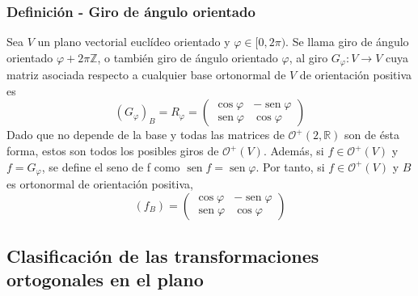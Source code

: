 \documentclass[12pt, a4paper, ones, notitlepage, openany,titlepage]{article}
\begin{document}
\subsubsection{Definición - Giro de ángulo orientado}
Sea $V$ un plano vectorial euclídeo orientado y $\varphi \in[0,2 \pi)$. Se llama giro de ángulo orientado $\varphi+2 \pi \mathbb{Z}$, o también giro de ángulo orientado $\varphi$, al giro $G_{\varphi}: V \rightarrow V$ cuya matriz asociada respecto a cualquier base ortonormal de $V$ de orientación positiva es
$$
\left(G_{\varphi}\right)_{B}=R_{\varphi}=\left(\begin{array}{rr}
	\cos \varphi & -\operatorname{sen} \varphi \\
	\operatorname{sen} \varphi & \cos \varphi
\end{array}\right)
$$
Dado que no depende de la base y todas las matrices de $\mathcal{O}^+(2,\mathbb{R})$ son de ésta forma, estos son todos los posibles giros de $\mathcal{O}^+(V)$. Además, si $f \in \mathcal{O}^+(V)$ y $f = G_\varphi$, se define el seno de f como $\operatorname{sen}f = \operatorname{sen}\varphi$. Por tanto, si $f \in \mathcal{O}^+(V)$ y $B$ es ortonormal de orientación positiva,
$$
(f_B) =
\begin{pmatrix}
	\operatorname{cos}\varphi & -\operatorname{sen}\varphi \\
	\operatorname{sen}\varphi & \operatorname{cos}\varphi
\end{pmatrix}
$$

\subsection{Clasificación de las transformaciones ortogonales en el plano}
\end{document}
